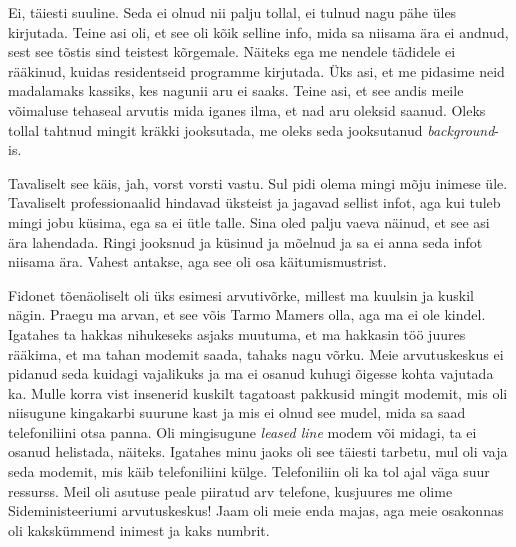 
Ei, täiesti suuline. Seda ei olnud nii palju tollal, ei tulnud nagu pähe üles 
kirjutada. Teine asi oli, et see oli kõik selline info,  mida sa niisama ära ei 
andnud, sest see tõstis sind teistest kõrgemale. Näiteks ega me nendele 
tädidele ei rääkinud, kuidas residentseid programme kirjutada. Üks asi, et me 
pidasime neid madalamaks kassiks, kes nagunii aru ei saaks. Teine asi, et see 
andis meile võimaluse tehaseal arvutis  mida iganes ilma, et nad aru oleksid 
saanud. Oleks tollal tahtnud mingit kräkki jooksutada, me oleks seda 
jooksutanud \emph{background}-is.


Tavaliselt see käis, jah, vorst vorsti vastu.  Sul pidi olema mingi mõju 
inimese üle. Tavaliselt professionaalid hindavad üksteist ja jagavad sellist 
infot, aga kui tuleb mingi jobu küsima, ega sa ei ütle talle. Sina oled palju 
vaeva näinud, et see asi ära lahendada. Ringi jooksnud ja küsinud ja mõelnud ja 
sa ei anna seda infot niisama ära. Vahest antakse, aga see oli osa 
käitumismustrist. 

Fidonet tõenäoliselt oli üks esimesi arvutivõrke, millest ma kuulsin ja kuskil 
nägin. Praegu ma arvan, et see võis Tarmo Mamers 
olla, aga ma ei ole kindel. Igatahes ta hakkas nihukeseks asjaks muutuma, et ma 
hakkasin töö juures rääkima, et ma tahan modemit saada, tahaks nagu võrku. Meie 
arvutuskeskus ei pidanud seda kuidagi vajalikuks ja ma ei osanud  kuhugi 
õigesse kohta vajutada ka. Mulle korra vist insenerid kuskilt tagatoast 
pakkusid mingit modemit, mis oli niisugune kingakarbi suurune kast ja mis ei 
olnud see mudel, mida sa saad telefoniliini otsa panna. Oli mingisugune 
\emph{leased line} modem või midagi, ta ei osanud helistada, näiteks. Igatahes 
minu jaoks oli see täiesti tarbetu,  mul oli vaja seda modemit, mis käib 
telefoniliini külge. Telefoniliin oli ka tol ajal väga suur ressurss. Meil oli 
asutuse peale piiratud arv telefone, kusjuures me olime Sideministeeriumi 
arvutuskeskus! Jaam oli meie enda majas, aga meie osakonnas oli kakskümmend 
inimest ja kaks numbrit. 



